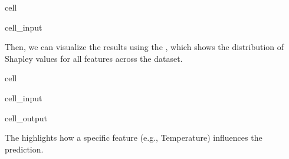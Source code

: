\documentclass[letterpaper,10pt,english]{jupyterBook}
\begin{document}
\begin{sphinxuseclass}{cell}\begin{sphinxVerbatimInput}

\begin{sphinxuseclass}{cell_input}
\begin{sphinxVerbatim}[commandchars=\\\{\}]
 

  
  
\end{sphinxVerbatim}

\end{sphinxuseclass}\end{sphinxVerbatimInput}

\end{sphinxuseclass}
\sphinxAtStartPar
Then, we can visualize the results using the , which shows the distribution of Shapley values for all features across the dataset.

\begin{sphinxuseclass}{cell}\begin{sphinxVerbatimInput}

\begin{sphinxuseclass}{cell_input}
\begin{sphinxVerbatim}[commandchars=\\\{\}]
  
\end{sphinxVerbatim}

\end{sphinxuseclass}\end{sphinxVerbatimInput}
\begin{sphinxVerbatimOutput}

\begin{sphinxuseclass}{cell_output}
\noindent{}

\end{sphinxuseclass}\end{sphinxVerbatimOutput}

\end{sphinxuseclass}
\sphinxAtStartPar
The  highlights how a specific feature (e.g., Temperature) influences the prediction.
\end{document}
